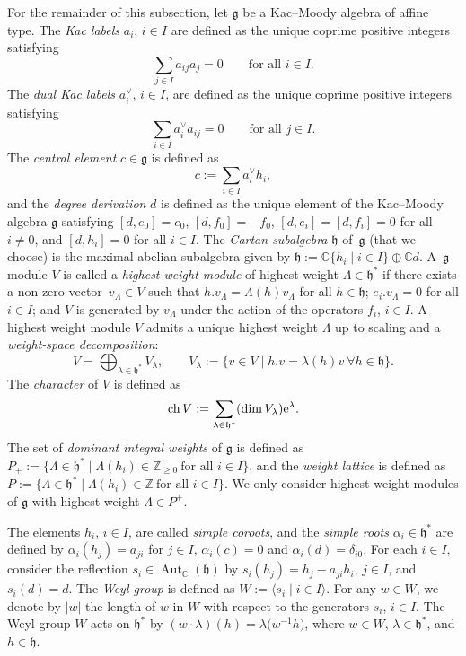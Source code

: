 \documentclass[10pt,a4paper]{amsart}
\numberwithin{equation}{section}
\theoremstyle{definition}
\newcommand{\C}{\mathbb{C}}
\begin{document}
For the remainder of this subsection, let $\mathfrak{g}$ be a Kac--Moody algebra of affine type. The \emph{Kac labels} $a_i$, $i\in I$ are defined as the unique coprime positive integers satisfying
\[
\sum_{j\in I} a_{ij} a_j = 0 \qquad\text{for all } i\in I.
\]
The \emph{dual Kac labels} $a_i^\vee$, $i\in I$, are defined as the unique coprime positive integers satisfying
\[
\sum_{i\in I} a_i^\vee a_{ij} = 0 \qquad\text{for all } j\in I.
\]
The \emph{central element} $c\in\mathfrak{g}$ is defined as
\[
c := \sum_{i\in I} a_i^\vee h_i,
\]
and the \emph{degree derivation} $d$ is defined as the unique element of the Kac--Moody algebra $\mathfrak g$ satisfying ${[d,e_0]=e_0}$, ${[d,f_0]=-f_0}$, ${[d,e_i]=[d,f_i]=0}$ for all $i\neq 0$, and $[d,h_i]=0$ for all $i\in I$. The \emph{Cartan subalgebra} $\mathfrak{h}$ of~$\mathfrak{g}$ (that we choose) is the maximal abelian subalgebra given by $\mathfrak{h} := \C \{h_i \mid i\in I\} \oplus \C d$.
A~$ \mathfrak g$-module $V$ is called a \emph{highest weight module} of highest weight $\Lambda\in\mathfrak h^{*}$ if there exists a non-zero vector~$v_\Lambda\in V$ such that $h.v_\Lambda = \Lambda(h)v_\Lambda$ for all $h\in \mathfrak{h}$; $e_i.v_\Lambda = 0$ for all $i \in I$; and $V$ is generated by $v_\Lambda$ under the action of the operators $f_i$, $i\in I$. A highest weight module $V$ admits a unique highest weight $\Lambda$ up to scaling and a \emph{weight-space decomposition}:
\[
V = \bigoplus_{\lambda \in \mathfrak{h}^*} V_\lambda,\qquad V_\lambda := \{v \in V \mid h.v = \lambda(h)v\ \forall h \in \mathfrak{h} \}.
\]
The \emph{character} of $V$ is defined as
\[\operatorname{ch} V := \sum_{\lambda \in \mathfrak{h}^*}(\dim V_\lambda) {\rm e}^\lambda.\]
The set of \emph{dominant integral weights} of $\mathfrak{g}$ is defined as $P_{+} := \{\Lambda\in\mathfrak h^{*} \mid \Lambda(h_i)\in\mathbb{Z}_{\ge0}\ \text{for all } i\in I\}$, and the \emph{weight lattice} is defined as $P := \{\Lambda\in\mathfrak h^{*} \mid \Lambda(h_i)\in\mathbb{Z}\ \text{for all } i\in I\}$. We only consider highest weight modules of $\mathfrak{g}$ with highest weight $\Lambda\in P^+$.

The elements $h_i$, $i\in I$, are called \emph{simple coroots}, and the \emph{simple roots} $\alpha_i\in\mathfrak h^*$ are defined by $\alpha_i(h_j)=a_{ji}$ for $j\in I$, $\alpha_i(c)=0$ and $\alpha_i(d)=\delta_{i0}$. For each $i\in I$, consider the reflection $s_i\in\operatorname{Aut}_{\mathbb C}(\mathfrak h)$ by $s_i(h_j)=h_j-a_{ji}h_i$, $j\in I$, and $s_i(d)=d$. The \emph{Weyl group} is defined as $W:=\langle s_i \mid i\in I \rangle$.
For any $w\in W$, we denote by $|w|$ the length of $w$ in $W$ with respect to the generators $s_i$, $i\in I$. The Weyl group $W$ acts on $\mathfrak h^{*}$ by $(w\cdot\lambda)(h)=\lambda\bigl(w^{-1}h\bigr)$, where $w\in W$, $\lambda\in\mathfrak h^{*}$, and $h\in\mathfrak h$.
\end{document}
